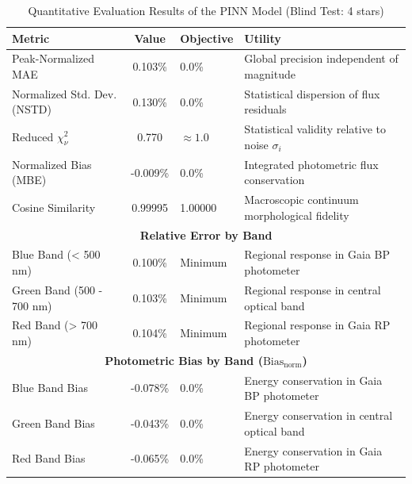 
\begin{table}[htpb]
\centering
\caption{Quantitative Evaluation Results of the PINN Model (Blind Test: 4 stars)}
\label{tab:pinn_evaluation}
\begin{tabular}{lcll}
\hline
\textbf{Metric} & \textbf{Value} & \textbf{Objective} & \textbf{Utility} \\
\hline
Peak-Normalized MAE & 0.103\% & 0.0\% & Global precision independent of magnitude \\
Normalized Std. Dev. (NSTD) & 0.130\% & 0.0\% & Statistical dispersion of flux residuals \\
Reduced $\chi^2_\nu$ & 0.770 & $\approx 1.0$ & Statistical validity relative to noise $\sigma_i$ \\
Normalized Bias (MBE) & -0.009\% & 0.0\% & Integrated photometric flux conservation \\
Cosine Similarity & 0.99995 & 1.00000 & Macroscopic continuum morphological fidelity \\
\hline
\multicolumn{4}{c}{\textbf{Relative Error by Band}} \\
\hline
Blue Band (< 500 nm) & 0.100\% & Minimum & Regional response in Gaia BP photometer \\
Green Band (500 - 700 nm) & 0.103\% & Minimum & Regional response in central optical band \\
Red Band (> 700 nm) & 0.104\% & Minimum & Regional response in Gaia RP photometer \\
\hline
\multicolumn{4}{c}{\textbf{Photometric Bias by Band ($\text{Bias}_{\text{norm}}$)}} \\
\hline
Blue Band Bias & -0.078\% & 0.0\% & Energy conservation in Gaia BP photometer \\
Green Band Bias & -0.043\% & 0.0\% & Energy conservation in central optical band \\
Red Band Bias & -0.065\% & 0.0\% & Energy conservation in Gaia RP photometer \\
\hline
\end{tabular}
\end{table}

